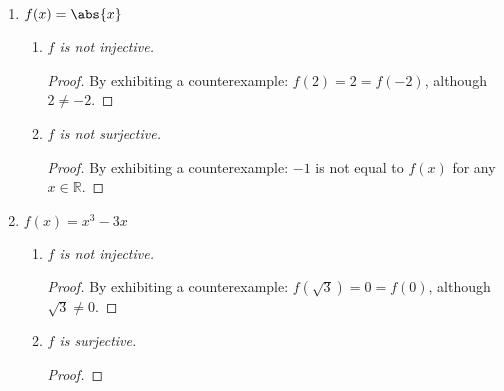 \begin{enumerate}[label={\Alph*.},font={\bfseries}]
\begin{enumerate}[label={\arabic*},font={\bfseries}]
\begin{enumerate}[label={\alph*},font={\bfseries}]
\begin{proof}
      \end{proof}
    \item {\sl $f$ is surjective.}
      \begin{proof}
        Take any element $y \in \mathbb{R}$. Then $y = (\sqrt[3]{y-1})^3 + 1 = f(\sqrt[3]{y-1})$. \\
        Thus, every $y \in \mathbb{R}$ is equal to $f(x)$ for $x = \sqrt[3]{y-1}$. \\
        Therefore $f$ is surjective.
      \end{proof}
    \end{enumerate}
  \item $f(x) = \abs{x}$
    \begin{enumerate}[label={\alph*},font={\bfseries}]
    \item {\sl $f$ is not injective.}
      \begin{proof}
        By exhibiting a counterexample:
        $f(2) = 2 = f(-2)$, although $2 \ne -2$.
      \end{proof}
    \item {\sl $f$ is not surjective.}
      \begin{proof}
        By exhibiting a counterexample:
        $-1$ is not equal to $f(x)$ for any $x \in \mathbb{R}$.
      \end{proof}
    \end{enumerate}
  \item $f(x) = x^3 - 3x$
    \begin{enumerate}[label={\alph*},font={\bfseries}]
    \item {\sl $f$ is not injective.}
      \begin{proof}
        By exhibiting a counterexample:
        $f(\sqrt{3}) = 0 = f(0)$, although $\sqrt{3} \ne 0$.
      \end{proof}
    \item {\sl $f$ is surjective.}
      \begin{proof}
      \end{proof}
    \end{enumerate}
  \end{enumerate}
\end{enumerate}
